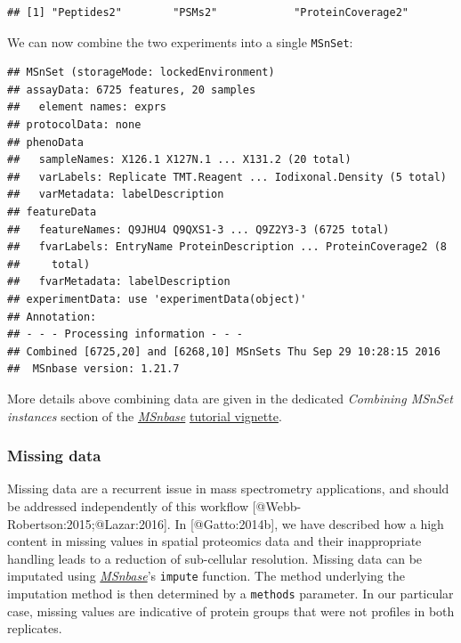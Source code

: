 \begin{verbatim}
## [1] "Peptides2"        "PSMs2"            "ProteinCoverage2"
\end{verbatim}

We can now combine the two experiments into a single \texttt{MSnSet}:

\begin{Shaded}
\begin{Highlighting}[]
\StringTok{ }
\end{Highlighting}
\end{Shaded}

\begin{verbatim}
## MSnSet (storageMode: lockedEnvironment)
## assayData: 6725 features, 20 samples 
##   element names: exprs 
## protocolData: none
## phenoData
##   sampleNames: X126.1 X127N.1 ... X131.2 (20 total)
##   varLabels: Replicate TMT.Reagent ... Iodixonal.Density (5 total)
##   varMetadata: labelDescription
## featureData
##   featureNames: Q9JHU4 Q9QXS1-3 ... Q9Z2Y3-3 (6725 total)
##   fvarLabels: EntryName ProteinDescription ... ProteinCoverage2 (8
##     total)
##   fvarMetadata: labelDescription
## experimentData: use 'experimentData(object)'
## Annotation:  
## - - - Processing information - - -
## Combined [6725,20] and [6268,10] MSnSets Thu Sep 29 10:28:15 2016 
##  MSnbase version: 1.21.7
\end{verbatim}

More details above combining data are given in the dedicated
\emph{Combining MSnSet instances} section of the
\emph{\href{http://bioconductor.org/packages/MSnbase}{MSnbase}}
\href{http://bioconductor.org/packages/release/bioc/vignettes/MSnbase/inst/doc/MSnbase-demo.pdf}{tutorial
vignette}.

\subsubsection{Missing data}\label{missing-data}

Missing data are a recurrent issue in mass spectrometry applications,
and should be addressed independently of this workflow
{[}@Webb-Robertson:2015;@Lazar:2016{]}. In {[}@Gatto:2014b{]}, we have
described how a high content in missing values in spatial proteomics
data and their inappropriate handling leads to a reduction of
sub-cellular resolution. Missing data can be imputated using
\emph{\href{http://bioconductor.org/packages/MSnbase}{MSnbase}}'s
\texttt{impute} function. The method underlying the imputation method is
then determined by a \texttt{methods} parameter. In our particular case,
missing values are indicative of protein groups that were not profiles
in both replicates.

